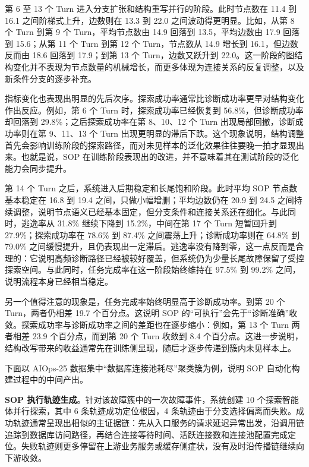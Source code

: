 第 6 至 13 个 Turn 进入分支扩张和结构重写并行的阶段。此时节点数在 11.4 到 16.1 之间阶梯式上升，边数则在 13.3 到 22.0 之间波动得更明显。比如，从第 8 个 Turn 到第 9 个 Turn，平均节点数由 14.9 回落到 13.5，平均边数由 17.9 回落到 15.6；从第 11 个 Turn 到第 12 个 Turn，节点数从 14.9 增长到 16.1，但边数反而由 18.6 回落到 17.9；到第 13 个 Turn，边数又跃升到 22.0。这一阶段的图结构变化并不表现为节点数量的机械增长，而更多体现为连接关系的反复调整，以及新条件分支的逐步补充。

指标变化也表现出明显的先后次序。探索成功率通常比诊断成功率更早对结构变化作出反应。例如，第 6 个 Turn 时，探索成功率已经恢复到 56.8\%，但诊断成功率却回落到 29.8\%；之后探索成功率在第 8、10、12 个 Turn 出现局部回撤，诊断成功率则在第 9、11、13 个 Turn 出现更明显的滞后下跌。这个现象说明，结构调整首先会影响训练阶段的探索路径，而对未见样本的泛化效果往往要晚一拍才显现出来。也就是说，SOP 在训练阶段表现出的改进，并不意味着其在测试阶段的泛化能力会同步提升。

第 14 个 Turn 之后，系统进入后期稳定和长尾饱和阶段。此时平均 SOP 节点数基本稳定在 16.8 到 19.4 之间，只做小幅增删；平均边数仍在 20.9 到 24.5 之间持续调整，说明节点语义已经基本固定，但分支条件和连接关系还在细化。与此同时，逃逸率从 31.8\% 继续下降到 15.2\%，中间在第 17 个 Turn 短暂回升到 27.9\%；探索成功率在 78.6\% 到 87.4\% 之间震荡上升；诊断成功率则在 64.8\% 到 79.0\% 之间缓慢提升，且仍表现出一定滞后。逃逸率没有降到零，这一点反而是合理的：它说明高频诊断路径已经被较好覆盖，但系统仍为少量长尾故障保留了受控探索空间。与此同时，任务完成率在这一阶段始终维持在 97.5\% 到 99.2\% 之间，说明流程本身已经相当稳定。

另一个值得注意的现象是，任务完成率始终明显高于诊断成功率。到第 20 个 Turn，两者仍相差 19.7 个百分点。这说明 SOP 的“可执行”会先于“诊断准确”收敛。探索成功率与诊断成功率之间的差距也在逐步缩小：例如，第 13 个 Turn 两者相差 23.9 个百分点，而到第 20 个 Turn 收敛到 8.4 个百分点。这进一步说明，结构改写带来的收益通常先在训练侧显现，随后才逐步传递到簇内未见样本上。

下面以 AIOps-25 数据集中“数据库连接池耗尽”聚类簇为例，说明 SOP 自动化构建过程中的中间产出。

\textbf{SOP 执行轨迹生成}。针对该故障簇中的一次故障事件，系统创建 10 个探索智能体并行探索，其中 6 条轨迹成功定位根因，4 条轨迹由于分支选择偏离而失败。成功轨迹通常呈现出相似的主证据链：先从入口服务的请求延迟异常出发，沿调用链追踪到数据库访问路径，再结合连接等待时间、活跃连接数和连接池配置完成定位。失败轨迹则更多停留在上游业务服务或缓存侧症状，没有及时沿传播链继续向下游收敛。


